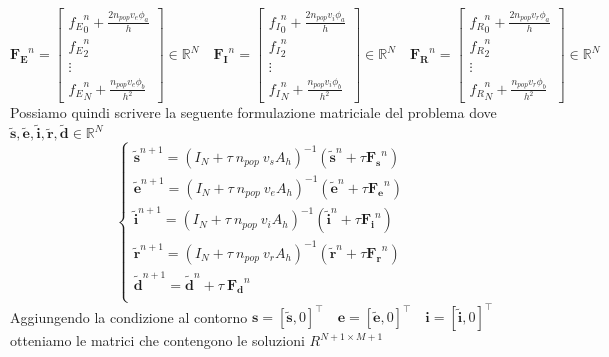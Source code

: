 \documentclass[11pt]{article}
\newcommand{\R}{\mathbb{R}}
\begin{document}
\begin{equation*}
\mathbf{F_E}^n = \begin{bmatrix} {f_E}_0^n + \frac{2 n_{pop} v_e \phi_a}{h}\\ {f_E}_2^n \\ \vdots \\ {f_E}_N^n + \frac{n_{pop} v_e \phi_b}{h^2} \end{bmatrix}\in \R^N \quad
\mathbf{F_I}^n =\begin{bmatrix} {f_I}_0^n + \frac{2 n_{pop} v_i \phi_a}{h}\\ {f_I}_2^n \\ \vdots \\ {f_I}_N^n + \frac{n_{pop} v_i \phi_b}{h^2}\end{bmatrix} \in \R^N \quad
\mathbf{F_R}^n =\begin{bmatrix} {f_R}_0^n +  \frac{2 n_{pop} v_r \phi_a}{h} \\ {f_R}_2^n \\ \vdots \\ {f_R}_N^n + \frac{n_{pop} v_r \phi_b}{h^2}\end{bmatrix} \in \R^N 
\end{equation*}
Possiamo quindi scrivere la seguente formulazione matriciale del problema dove \( \mathbf{\tilde{s}},\mathbf{\tilde{e}},\mathbf{\tilde{i}},\mathbf{\tilde{r}}, \mathbf{\tilde{d}} \in \R^N \)
\begin{equation*}
\begin{cases}
\mathbf{\tilde{s}}^{n+1}= (I_N+ \tau \ n_{pop} \ v_s A_h )^{-1} (\mathbf{\tilde{s}}^n + \tau \mathbf{F_s}^n) \\
\mathbf{\tilde{e}}^{n+1}= (I_N+ \tau \ n_{pop} \ v_e A_h )^{-1} (\mathbf{\tilde{e}}^n + \tau \mathbf{F_e}^n) \\
\mathbf{\tilde{i}}^{n+1}= (I_N+ \tau \ n_{pop} \ v_i A_h )^{-1} (\mathbf{\tilde{i}}^n + \tau \mathbf{F_i}^n) \\
\mathbf{\tilde{r}}^{n+1}= (I_N+ \tau \ n_{pop} \ v_r A_h)^{-1} (\mathbf{\tilde{r}}^n + \tau \mathbf{F_r}^n ) \\
\mathbf{\tilde{d}}^{n+1}= \mathbf{\tilde{d}}^n + \tau \ \mathbf{F_d}^n \\ 
\end{cases}
\end{equation*}
Aggiungendo la condizione al contorno
\( \mathbf{s}=[ \mathbf{\tilde{s}}, 0]^\top  \quad  \mathbf{e}=[ \mathbf{\tilde{e}}, 0]^\top  \quad \mathbf{i}=[ \mathbf{\tilde{i}}, 0]^\top\) 
otteniamo le matrici che contengono le soluzioni \( R^{N+1 \times M+1} \)
\end{document}
